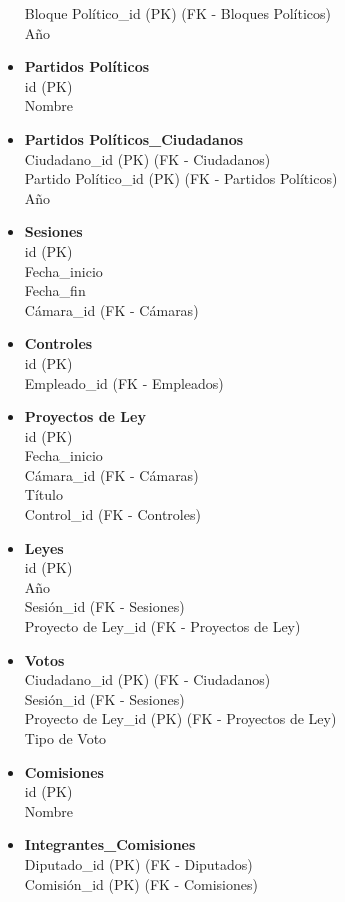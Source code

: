 \begin{itemize}
	Bloque Político\_id (PK) (FK - Bloques Políticos)\\
	Año
	\item \textbf{Partidos Políticos} \\
	id (PK) \\
	Nombre 
	\item \textbf{Partidos Políticos\_Ciudadanos} \\
	Ciudadano\_id (PK) (FK - Ciudadanos) \\
	Partido Político\_id (PK) (FK - Partidos Políticos)\\
	Año
	\item \textbf{Sesiones} \\
	id (PK) \\
	Fecha\_inicio \\
	Fecha\_fin \\
	Cámara\_id (FK - Cámaras)
	\item \textbf{Controles} \\
	id (PK) \\
	Empleado\_id (FK - Empleados)
	\item \textbf{Proyectos de Ley} \\
	id (PK) \\
	Fecha\_inicio \\
	Cámara\_id (FK - Cámaras) \\ 
	Título \\
	Control\_id (FK - Controles)
	\item \textbf{Leyes} \\
	id (PK) \\
	Año \\
	Sesión\_id (FK - Sesiones) \\
	Proyecto de Ley\_id (FK - Proyectos de Ley)
	\item \textbf{Votos} \\
	Ciudadano\_id (PK) (FK - Ciudadanos) \\
	Sesión\_id  (FK - Sesiones) \\
	Proyecto de Ley\_id (PK) (FK - Proyectos de Ley) \\
	Tipo de Voto
 	\item \textbf{Comisiones} \\
 	id (PK) \\
 	Nombre 
	\item \textbf{Integrantes\_Comisiones} \\
	Diputado\_id (PK) (FK - Diputados) \\
	Comisión\_id (PK) (FK - Comisiones) \\

\end{itemize}
